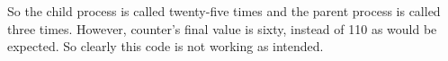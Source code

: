 \documentclass[12pt, titlepage]{article}
\begin{document}
So the child process is called twenty-five times and the parent process is called three times.
However, counter's final value is sixty, instead of 110 as would be expected.
So clearly this code is not working as intended.
\subsection*{}
\end{document}
